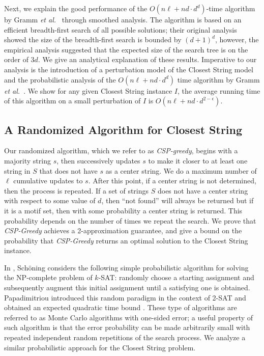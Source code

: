 Next, we explain the good performance of the $O(n\ell + nd \cdot d^d)$-time algorithm by Gramm {\em et al.}\ \cite{GNR03} through smoothed analysis.  The algorithm is based on an efficient breadth-first search of all possible solutions; their original analysis showed the size of the breadth-first search is bounded by $(d + 1)^d$, however, the empirical analysis suggested that the expected size of the search tree is on the order of $3d$.  We give an analytical explanation of these results.  Imperative to our analysis is the introduction of a perturbation model of the {\sc Closest String} model and the probabilistic analysis of the $O(n\ell + nd \cdot d^d)$ time algorithm by Gramm {\em et al.}\ \cite{GNR03}. We show for any given {\sc Closest String} instance $I$, the average running time of this algorithm on a small perturbation of $I$ is $O(n\ell + nd \cdot d^{2 - \epsilon})$. 

\subsection{A Randomized Algorithm for {\sc Closest String}}

Our randomized algorithm, which we refer to as {\em CSP-greedy}, begins with a majority string $s$, then successively updates $s$ to make it closer to at least one string in $S$ that does not have $s$ as a center string.  We do a maximum number of $\ell$ cumulative updates to $s$. After this point, if a center string is not determined, then the process is repeated.  If a set of strings $S$ does not have a center string with respect to some value of $d$, then ``not found'' will always be returned but if it is a motif set, then with some probability a center string is returned. This probability depends on the number of times we repeat the search.  We prove that {\em CSP-Greedy} achieves a 2-approximation guarantee, and give a bound on the probability that {\em CSP-Greedy} returns an optimal solution to the {\sc Closest String} instance.

In \cite{Sch99}, Sch\"{o}ning considers the following simple probabilistic algorithm for solving the NP-complete problem of $k$-SAT: randomly choose a starting assignment and subsequently augment this initial assignment until a satisfying one is obtained.  Papadimitriou introduced this random paradigm in the context of 2-SAT and obtained an expected quadratic time bound \cite{pap91}.  These type of algorithms are referred to as Monte Carlo algorithms with one-sided error; a useful property of such algorithm is that the error probability can be made arbitrarily small with repeated independent random repetitions of the search process. We analyze a similar probabilistic approach for the {\sc Closest String} problem.  

